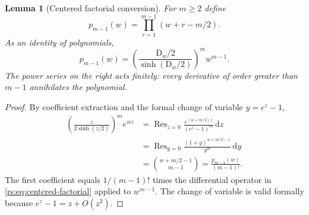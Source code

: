 \documentclass[11pt,a4paper,oneside,openany]{book}
\numberwithin{equation}{chapter}
\newtheorem{lemma}[theorem]{Lemma}
\theoremstyle{definition}
\theoremstyle{remark}
\newcommand{\dd}{\,\mathrm d}
\DeclareMathOperator{\Res}{Res}
\newcommand{\D}{\mathrm D}
\begin{document}
\begin{lemma}[Centered factorial conversion]\label{rs:lem:centered-factorial}
For $m\geq2$ define
\begin{equation}
 p_{m-1}(w)=\prod_{r=1}^{m-1}(w+r-m/2).
\end{equation}
As an identity of polynomials,
\begin{equation}
 p_{m-1}(w)=
 \left(\frac{\D_w/2}{\sinh(\D_w/2)}\right)^m w^{m-1}.
 \label{rs:eq:centered-factorial}
\end{equation}
The power series on the right acts finitely: every derivative of
order greater than $m-1$ annihilates the polynomial.
\end{lemma}
\begin{proof}
By coefficient extraction and the formal change of variable
$y=e^z-1$,
\begin{align}
 [z^{m-1}]\left(\frac{z}{2\sinh(z/2)}\right)^m e^{wz}
 &=\Res_{z=0}\frac{e^{(w+m/2)z}}{(e^z-1)^m}\dd z\nonumber\\
 &=\Res_{y=0}\frac{(1+y)^{w+m/2-1}}{y^m}\dd y\nonumber\\
 &=\binom{w+m/2-1}{m-1}
 =\frac{p_{m-1}(w)}{(m-1)!}.
 \label{rs:eq:residue-factorial}
\end{align}
The first coefficient equals $1/(m-1)!$ times the differential
operator in \eqref{rs:eq:centered-factorial} applied to $w^{m-1}$.
The change of variable is valid formally because $e^z-1=z+O(z^2)$.
\end{proof}
\end{document}
